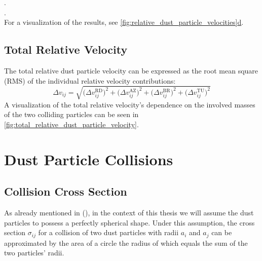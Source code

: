         . \\
        . \\

        For a visualization of the results, see \hyperref[fig:relative_dust_particle_velocities]
        {\cref*{fig:relative_dust_particle_velocities}d}.

        

    \subsection{Total Relative Velocity}

        The total relative dust particle velocity can be expressed as the root mean square (RMS) of 
        the individual relative velocity contributions:
        \begin{equation}
            \Delta v_{ij}
                = \sqrt{
                    \big(\Delta v^\text{RD}_{ij}\big)^2
                    + \big(\Delta v^\text{AZ}_{ij}\big)^2
                    + \big(\Delta v^\text{BR}_{ij}\big)^2
                    + \big(\Delta v^\text{TU}_{ij}\big)^2
                }
        \end{equation}
        A visualization of the total relative velocity's dependence on the involved masses of the
        two colliding particles can be seen in \cref{fig:total_relative_dust_particle_velocity}.

        


\clearpage\section{Dust Particle Collisions}

    \subsection{Collision Cross Section}
        
        As already mentioned in (), in the context of this thesis we will assume the
        dust particles to possess a perfectly spherical shape. Under this assumption, the cross
        section $\sigma_{ij}$ for a collision of two dust particles with radii $a_i$ and $a_j$ can
        be approximated by the area of a circle the radius of which equals the sum of the two
        particles' radii. \\

